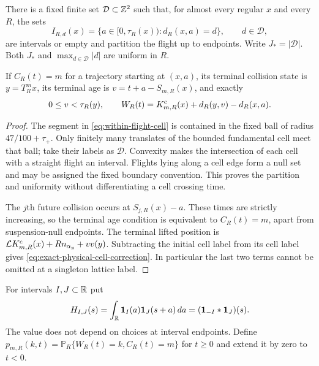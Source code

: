 \begin{lemma}
\label{lem:finite-flight-cell-partition}
There is a fixed finite set $\mathcal D\subset\mathbb Z^2$ such that, for
almost every regular $x$ and every $R$, the sets
\[
 I_{R,d}(x)=\{a\in[0,\tau_R(x)):d_R(x,a)=d\},\qquad d\in\mathcal D,
\]
are intervals or empty and partition the flight up to endpoints.
Write $J_* = |\mathcal D|$. Both $J_*$ and $\max_{d\in\mathcal D}|d|$
are uniform in $R$.

If $C_R(t)=m$ for a trajectory starting at $(x,a)$, its terminal
collision state is $y=T_R^mx$, its terminal age is
$v=t+a-S_{m,R}(x)$, and exactly
\begin{equation}\label{eq:exact-physical-cell-correction}
 0\le v<\tau_R(y),\qquad
 W_R(t)=K^{\rm c}_{m,R}(x)+d_R(y,v)-d_R(x,a).
\end{equation}
\end{lemma}
\begin{proof}
The segment in \eqref{eq:within-flight-cell} is contained in the fixed
ball of radius $47/100+\tau_+$. Only finitely many translates of the
bounded fundamental cell meet that ball; take their labels as
$\mathcal D$. Convexity makes the intersection of each cell with a
straight flight an interval. Flights lying along a cell edge form a
null set and may be assigned the fixed boundary convention. This
proves the partition and uniformity without differentiating a cell
crossing time.

The $j$th future collision occurs at $S_{j,R}(x)-a$. These times are
strictly increasing, so the terminal age condition is equivalent to
$C_R(t)=m$, apart from suspension-null endpoints. The terminal lifted
position is
$\mathcal L K^{\rm c}_{m,R}(x)+Rn_{\alpha_y}+v v(y)$.
Subtracting the initial cell label from its cell label gives
\eqref{eq:exact-physical-cell-correction}. In particular the last two
terms cannot be omitted at a singleton lattice label.
\end{proof}

For intervals $I,J\subset\mathbb R$ put
\begin{equation}\label{eq:flight-overlap-kernel}
 H_{I,J}(s)=\int_\R\one_I(a)\one_J(s+a)\,da
                         =(\one_{-I}*\one_J)(s).
\end{equation}
The value does not depend on choices at interval endpoints. Define
$p_{m,R}(k,t)=\mathbb P_R\{W_R(t)=k,C_R(t)=m\}$ for $t\ge0$ and
extend it by zero to $t<0$.

